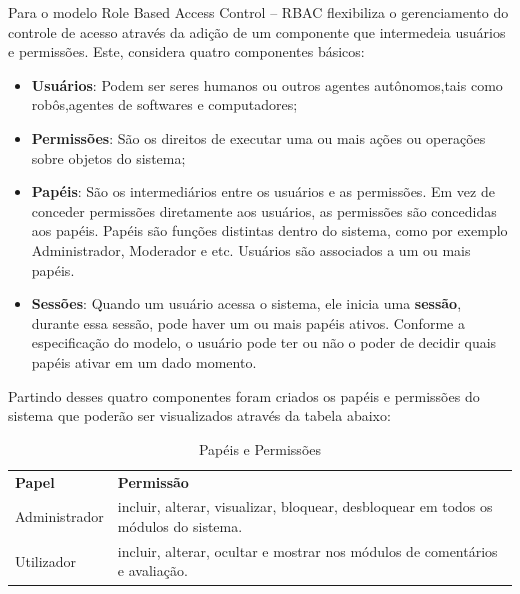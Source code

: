 \documentclass[12pt, a4paper]{report}
\begin{document}
Para \citep{sandhu1997} o modelo Role Based Access Control – RBAC flexibiliza o gerenciamento do controle de acesso através da adição de um componente que intermedeia usuários e permissões. Este, considera quatro componentes básicos:
\begin{itemize}
\item \textbf{Usuários}: Podem ser seres humanos ou outros agentes autônomos,tais como robôs,agentes de softwares e computadores;
\item \textbf{Permissões}: São os direitos de executar uma ou mais ações ou operações sobre objetos do sistema;
\item \textbf{Papéis}: São os intermediários entre os usuários e as permissões. Em vez de conceder permissões diretamente aos usuários, as permissões são concedidas aos papéis. Papéis são funções distintas dentro do sistema, como por exemplo Administrador, Moderador e etc. Usuários são associados a um ou mais papéis.  
\item \textbf{Sessões}: Quando um usuário acessa o sistema, ele inicia uma \textbf{sessão}, durante  essa  sessão, pode haver  um  ou  mais  papéis ativos. Conforme a especificação do modelo, o usuário pode ter ou não o poder de decidir quais papéis ativar em um dado momento.
\end{itemize}

Partindo desses quatro componentes foram criados os papéis e permissões do sistema que poderão ser visualizados através da tabela abaixo:

\begin{table}[h]
 \centering
 {\renewcommand\arraystretch{1.25}
 \begin{tabular}{ l l }
  \cline{1-1}\cline{2-2}  
    \multicolumn{1}{|p{3.850cm}|}{\textbf{Papel} \centering } &
    \multicolumn{1}{p{4.217cm}|}{\textbf{Permissão} \centering }
  \\  
  \cline{1-1}\cline{2-2}  
    \multicolumn{1}{|p{3.850cm}|}{Administrador} &
    \multicolumn{1}{p{4.217cm}|}{incluir, alterar, visualizar, bloquear, desbloquear em todos os módulos do sistema.}
  \\  
  \cline{1-1}\cline{2-2}  
    \multicolumn{1}{|p{3.850cm}|}{Utilizador} &
    \multicolumn{1}{p{4.217cm}|}{incluir, alterar, ocultar e mostrar nos módulos de comentários e avaliação.}
  \\  
  \hline
 \end{tabular} }
 \caption{Papéis e Permissões}
\end{table}
\end{document}
